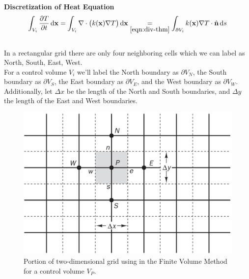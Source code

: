 \documentclass[final]{beamer}
\begin{document}
\begin{frame}[t]{\bf Discretization of Heat Equation}
	\begin{equation}
		\int_{V_i}\frac{\partial T}{\partial t}\dif\mathbf{x}=\int_{V_i}\nabla\cdot \left(k(\mathbf{x})\nabla T\right)\dif\mathbf{x}\underset{\eqref{eqn:div-thm}}{=}\int_{\partial V_i}k(\mathbf{x})\nabla T\cdot\hat{\mathbf{n}}\dif s\label{eqn:Vol-to-Surface-FVM}
	\end{equation}\\
	\vspace{1em}
	\pause
	In a rectangular grid there are only four neighboring cells which we can label as North, South, East, West.\\\vspace{1em}
	\pause
	For a control volume $V_i$ we'll label the North boundary as $\partial V_N$, the South boundary as $\partial V_S$, the East boundary as $\partial V_E$, and the West boundary as $\partial V_W$.\\\vspace{1em}
	\pause
	Additionally, let $\Delta x$ be the length of the North and South boundaries, and $\Delta y$ the length of the East and West boundaries.
\end{frame}

\begin{frame}
	\begin{figure}
		\includegraphics[width=0.8\linewidth]{FVM-grid.png}
		\caption{Portion of two-dimensional grid using in the Finite Volume Method for a control volume $V_P$. \cite[p. 129]{Versteeg2007}}
	\end{figure}
\end{frame}
\end{document}

